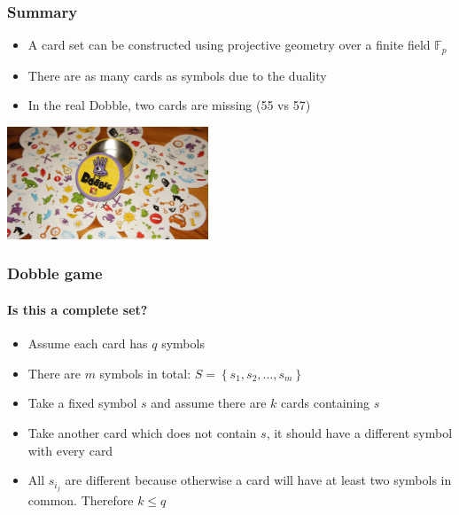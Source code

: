 \documentclass{beamer}
\begin{document}
  \begin{frame}
  	\frametitle{Summary}
	\begin{itemize}
		\item A card set can be constructed using projective geometry over a finite field $\mathbb{F}_p$
		\item There are as many cards as symbols due to the duality
		\item In the real Dobble, two cards are missing (55 vs 57)
	\end{itemize}
	\vspace{0.5cm}
	\begin{center}
	\includegraphics[width=6cm]{images/dobble_cards}
	\end{center}  	
  \end{frame}
   \begin{frame}
  	\frametitle{Dobble game}
	\framesubtitle{Is this a complete set?}
	\begin{itemize}
		\item Assume each card has $q$ symbols
		\item There are $m$ symbols in total: $S = \left\{ s_1, s_2, \dots, s_m\right\}$
		\item Take a fixed symbol $s$ and assume there are $k$ cards containing $s$
		\item Take another card which does not contain $s$, it should have a different symbol with every card
		\begin{center}
		\end{center}
		\item All $s_{i_j}$ are different because otherwise a card will have at least two symbols in common. Therefore $k \leq q$
		\end{itemize}
  \end{frame}
\end{document}
